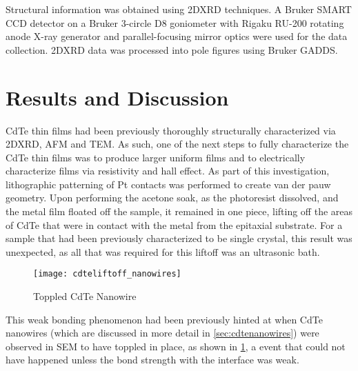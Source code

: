 Structural information was obtained using 2DXRD techniques.
A Bru\-ker SMART CCD detector on a Bruker 3-circle D8 goniometer with Rigaku RU-200 rotating anode X-ray generator and parallel-focusing mirror optics were used for the data collection.
2DXRD data was processed into pole figures using Bruker GADDS\@.
\section{Results and Discussion}
CdTe thin films had been previously thoroughly structurally characterized via 2DXRD, AFM and TEM\@. As such, one of the next steps to fully characterize the CdTe thin films was to produce larger uniform films\cite{stephen-thesis} and to electrically characterize films via resistivity and hall effect.
As part of this investigation, lithographic patterning of Pt contacts was performed to create van der pauw geometry.
Upon performing the acetone soak, as the photoresist dissolved, and the metal film floated off the sample, it remained in one piece, lifting off the areas of CdTe that were in contact with the metal from the epitaxial substrate.
For a sample that had been previously characterized to be single crystal, this result was unexpected, as all that was required for this liftoff was an ultrasonic bath.
\begin{figure}
 \centering \texttt{[image: cdteliftoff\_nanowires]}
 \caption{\label{fig:cdteliftoff_nanowires}Toppled CdTe Nanowire}
\end{figure}
This weak bonding phenomenon had been previously hinted at when CdTe nanowires (which are discussed in more detail in \cref{sec:cdtenanowires}) were observed in SEM to have toppled in place, as shown in \cref{fig:cdteliftoff_nanowires}, a event that could not have happened unless the bond strength with the interface was weak.

